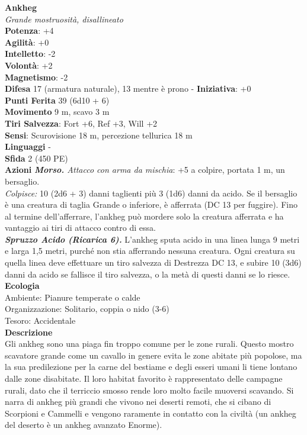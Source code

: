 \begin{multicols}{2}
\medskip\textbf{Ankheg}\\
\emph{Grande mostruosità, disallineato}\\
\textbf{Potenza}: +4\\
\textbf{Agilità}: +0\\
\textbf{Intelletto}: -2\\
\textbf{Volontà}: +2\\
\textbf{Magnetismo}: -2\\
\textbf{Difesa} 17 (armatura naturale), 13 mentre è prono - \textbf{Iniziativa}: +0\\
\textbf{Punti Ferita} 39 (6d10 + 6)\\
\textbf{Movimento} 9 m, scavo 3 m\\
\textbf{Tiri Salvezza}: Fort +6, Ref +3, Will +2\\
\textbf{Sensi}: Scurovisione 18 m, percezione tellurica 18 m\\
\textbf{Linguaggi} -\\
\textbf{Sfida} 2 (450 PE)\smallskip\\
\smallskip\textbf{Azioni}
\emph{\textbf{Morso.} Attacco con arma da mischia}: +5 a colpire, portata 1 m, un bersaglio.\\
\emph{Colpisce:} 10 (2d6 + 3) danni taglienti più 3 (1d6) danni da acido. Se il bersaglio è una creatura di taglia Grande o inferiore, è afferrata (DC 13 per fuggire). Fino al termine dell'afferrare, l'ankheg può mordere solo la creatura afferrata e ha vantaggio ai tiri di attacco contro di essa.\\
\emph{\textbf{Spruzzo Acido (Ricarica 6).}} L'ankheg sputa acido in una linea lunga 9 metri e larga 1,5 metri, purché non stia afferrando nessuna creatura. Ogni creatura su quella linea deve effettuare un tiro salvezza di Destrezza DC 13, e subire 10 (3d6) danni da acido se fallisce il tiro salvezza, o la metà di questi danni se lo riesce.\\
\textbf{Ecologia}\\
Ambiente: Pianure temperate o calde\\
Organizzazione: Solitario, coppia o nido (3-6)\\
Tesoro: Accidentale\\
\textbf{Descrizione}\\
Gli ankheg sono una piaga fin troppo comune per le zone rurali. Questo mostro scavatore grande come un cavallo in genere evita le zone abitate più popolose, ma la sua predilezione per la carne del bestiame e degli esseri umani li tiene lontano dalle zone disabitate. Il loro habitat favorito è rappresentato delle campagne rurali, dato che il terriccio smosso rende loro molto facile muoversi scavando. Si narra di ankheg più grandi che vivono nei deserti remoti, che si cibano di Scorpioni e Cammelli e vengono raramente in contatto con la civiltà (un ankheg del deserto è un ankheg avanzato Enorme).\\

\end{multicols}
